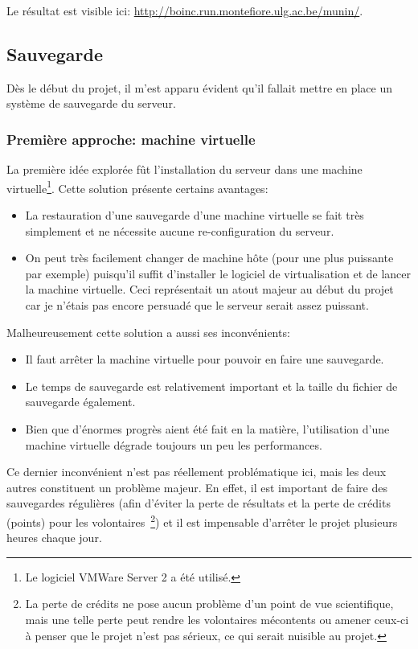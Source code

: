 \documentclass[a4paper, 11pt]{article}
\begin{document}
Le résultat est visible ici: \url{http://boinc.run.montefiore.ulg.ac.be/munin/}.

\subsection{Sauvegarde}
Dès le début du projet, il m'est apparu évident qu'il fallait mettre en place un système de sauvegarde du serveur.

\subsubsection{Première approche: machine virtuelle}
La première idée explorée fût l'installation du serveur dans une machine virtuelle\footnote{Le logiciel VMWare Server 2 a été utilisé.}. %
Cette solution présente certains avantages:
\begin{itemize}
\item La restauration d'une sauvegarde d'une machine virtuelle se fait très simplement et ne nécessite aucune re-configuration du serveur.
\item On peut très facilement changer de machine hôte (pour une plus puissante par exemple) puisqu'il suffit d'installer le logiciel de virtualisation et de lancer la machine virtuelle. Ceci représentait un atout majeur au début du projet car je n'étais pas encore persuadé que le serveur serait assez puissant.
\end{itemize}
Malheureusement cette solution a aussi ses inconvénients:
\begin{itemize}
\item Il faut arrêter la machine virtuelle pour pouvoir en faire une sauvegarde.
\item Le temps de sauvegarde est relativement important et la taille du fichier de sauvegarde également.
\item Bien que d'énormes progrès aient été fait en la matière, l'utilisation d'une machine virtuelle dégrade toujours un peu les performances.
\end{itemize}
Ce dernier inconvénient n'est pas réellement problématique ici, mais les deux autres constituent un problème majeur. En effet, il est important de faire des sauvegardes régulières (afin d'éviter la perte de résultats et la perte de crédits (points) pour les volontaires~\footnote{La perte de crédits ne pose aucun problème d'un point de vue scientifique, mais une telle perte peut rendre les volontaires mécontents ou amener ceux-ci à penser que le projet n'est pas sérieux, ce qui serait nuisible au projet.}) et il est impensable d'arrêter le projet plusieurs heures chaque jour.
\end{document}
